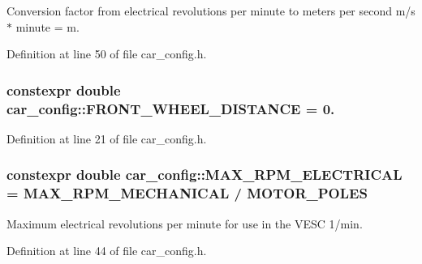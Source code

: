Conversion factor from electrical revolutions per minute to meters per second  m/s $\ast$ minute = m. 



Definition at line 50 of file car\+\_\+config.\+h.

\subsubsection[{\texorpdfstring{F\+R\+O\+N\+T\+\_\+\+W\+H\+E\+E\+L\+\_\+\+D\+I\+S\+T\+A\+N\+CE}{FRONT_WHEEL_DISTANCE}}]{\setlength{\rightskip}{0pt plus 5cm}constexpr double car\+\_\+config\+::\+F\+R\+O\+N\+T\+\_\+\+W\+H\+E\+E\+L\+\_\+\+D\+I\+S\+T\+A\+N\+CE = 0.}\hypertarget{namespacecar__config_a80d9d6f97a63ffcaba87b65a9e1e29e4}{}\label{namespacecar__config_a80d9d6f97a63ffcaba87b65a9e1e29e4}


Definition at line 21 of file car\+\_\+config.\+h.

\subsubsection[{\texorpdfstring{M\+A\+X\+\_\+\+R\+P\+M\+\_\+\+E\+L\+E\+C\+T\+R\+I\+C\+AL}{MAX_RPM_ELECTRICAL}}]{\setlength{\rightskip}{0pt plus 5cm}constexpr double car\+\_\+config\+::\+M\+A\+X\+\_\+\+R\+P\+M\+\_\+\+E\+L\+E\+C\+T\+R\+I\+C\+AL = {\bf M\+A\+X\+\_\+\+R\+P\+M\+\_\+\+M\+E\+C\+H\+A\+N\+I\+C\+AL} / {\bf M\+O\+T\+O\+R\+\_\+\+P\+O\+L\+ES}}\hypertarget{namespacecar__config_aaf4d6a90e2b9c983b0b0d29a584c399b}{}\label{namespacecar__config_aaf4d6a90e2b9c983b0b0d29a584c399b}


Maximum electrical revolutions per minute for use in the V\+E\+SC  1/min. 



Definition at line 44 of file car\+\_\+config.\+h.

